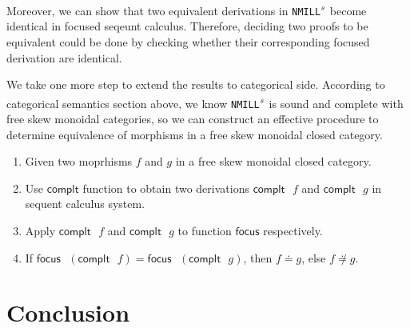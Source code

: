 \documentclass[submission,copyright,creativecommons]{eptcs}
\newtheorem{theorem}{Theorem}[section]
\theoremstyle{definition}
\newcommand{\RI}{\mathsf{RI}}
\newcommand{\NMILL}{\texttt{NMILL}}
\newcommand{\SkNMILL}{\NMILL\textsuperscript{\textit{s}}}
\begin{document}
Moreover, we can show that two equivalent derivations in \SkNMILL\ become identical in focused seqeunt calculus.
Therefore, deciding two proofs to be equivalent could be done by checking whether their corresponding focused derivation are identical.

We take one more step to extend the results to categorical side.
According to categorical semantics section above, we know \SkNMILL\ is sound and complete with free skew monoidal categories, so we can construct an effective procedure to determine equivalence of morphisms in a free skew monoidal closed category.
\begin{enumerate}
  \item Given two moprhisms $f$ and $g$ in a free skew monoidal closed category.
  \item Use $\mathsf{complt}$ function to obtain two derivations $\mathsf{complt} \text{ } f$ and $\mathsf{complt} \text{ } g$ in sequent calculus system.
  \item Apply $\mathsf{complt} \text{ } f$ and $\mathsf{complt} \text{ } g$ to function $\mathsf{focus}$ respectively.
  \item If $\mathsf{focus} \text{ } (\mathsf{complt} \text{ } f) = \mathsf{focus} \text{ } (\mathsf{complt} \text{ } g)$, then $f \doteq g$, else $f \not\doteq g$.
\end{enumerate}


\section{Conclusion}

  
  
\end{document}
